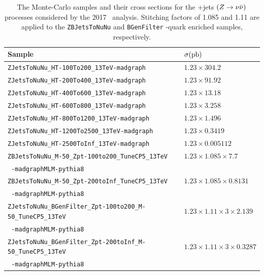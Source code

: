 \begin{table}[htbp]
  \caption[\bosZ+jets $(\bosZ \rightarrow \nu\bar{\nu})$ Samples for \VHbb\ 2017]{The Monte-Carlo samples and their cross sections for the \bosZ+jets $(\bosZ \rightarrow \nu\bar{\nu})$ processes considered by the 2017 \VHbb\ analysis. Stitching factors of 1.085 and 1.11 are applied to the \texttt{ZBJetsToNuNu} and \texttt{BGenFilter} \qrkb-quark enriched samples, respectively.}
  \label{tbl:MCZtoNuNu}
  \small
  \begin{tabularx}{6.5in}{lX}
    \hline
    Sample                                                               & $\sigma (\mathrm{pb})$                            \\
    \hline
    \texttt{ZJetsToNuNu\_HT-100To200\_13TeV-madgraph}                    & $1.23 \times 304.2$                       \\
    \texttt{ZJetsToNuNu\_HT-200To400\_13TeV-madgraph}                    & $1.23 \times 91.92$                       \\
    \texttt{ZJetsToNuNu\_HT-400To600\_13TeV-madgraph}                    & $1.23 \times 13.18$                       \\
    \texttt{ZJetsToNuNu\_HT-600To800\_13TeV-madgraph}                    & $1.23 \times 3.258$                       \\
    \texttt{ZJetsToNuNu\_HT-800To1200\_13TeV-madgraph}                   & $1.23 \times 1.496$                       \\
    \texttt{ZJetsToNuNu\_HT-1200To2500\_13TeV-madgraph}                  & $1.23 \times 0.3419$                      \\
    \texttt{ZJetsToNuNu\_HT-2500ToInf\_13TeV-madgraph}                   & $1.23 \times 0.005112$                    \\
    \texttt{ZBJetsToNuNu\_M-50\_Zpt-100to200\_TuneCP5\_13TeV}            & $1.23 \times 1.085 \times 7.7$            \\
    \texttt{  -madgraphMLM-pythia8}                                      &                                           \\
    \texttt{ZBJetsToNuNu\_M-50\_Zpt-200toInf\_TuneCP5\_13TeV}            & $1.23 \times 1.085 \times 0.8131$         \\
    \texttt{  -madgraphMLM-pythia8}                                      &                                           \\
    \texttt{ZJetsToNuNu\_BGenFilter\_Zpt-100to200\_M-50\_TuneCP5\_13TeV} & $1.23 \times 1.11 \times 3 \times 2.139$  \\
    \texttt{  -madgraphMLM-pythia8}                                      &                                           \\
    \texttt{ZJetsToNuNu\_BGenFilter\_Zpt-200toInf\_M-50\_TuneCP5\_13TeV} & $1.23 \times 1.11 \times 3 \times 0.3287$ \\
    \texttt{  -madgraphMLM-pythia8}                                      &                                           \\
    \hline
  \end{tabularx}
\end{table}

